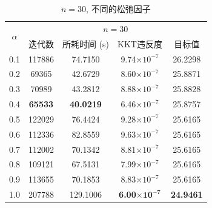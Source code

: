 \documentclass[UTF8,10.5pt,a4paper]{ctexart}
\theoremstyle{definition}
\theoremstyle{definition}
\begin{document}
\begin{table}[htbp]
	\renewcommand{\captionfont}{\small}
    \centering
    \caption{$n=30$, 不同的松弛因子}
    \label{n30alpha}
    \vskip 4mm
    \begin{tabular}{c|c|c|c|c}
        \hline
        \multirow{2}{*}{$\alpha$} & \multicolumn{4}{c}{$n=30$}\\\cline{2-5}
          & 迭代数 & 所耗时间 (s) & KKT违反度 & 目标值\\\hline
        0.1 & 117886 & 74.7150 & 9.74$\times10^{-7}$ & 26.2298 \\\hline
        0.2 & 69365 & 42.6729 & 8.60$\times10^{-7}$ & 25.8871 \\\hline
        0.3 & 70989 & 43.2812 & 8.88$\times10^{-7}$ & 25.8828 \\\hline
        0.4 & \textbf{65533} & \textbf{40.0219} & 6.46$\times10^{-7}$ & 25.8757 \\\hline
        0.5 & 122029 & 76.4424 & 9.28$\times10^{-7}$ & 25.6165 \\\hline
        0.6 & 112336 & 82.8559 & 9.63$\times10^{-7}$ & 25.6165 \\\hline
        0.7 & 112002 & 70.1342 & 8.81$\times10^{-7}$ & 25.6165 \\\hline
        0.8 & 109121 & 67.5131 & 7.99$\times10^{-7}$ & 25.6165 \\\hline
        0.9 & 113655 & 70.1853 & 8.83$\times10^{-7}$ & 25.6165 \\\hline
        1.0 & 207788 & 129.1006 & \textbf{6.00$\mathbf{\times10^{-7}}$} & \textbf{24.9461} \\\hline
    \end{tabular}
\end{table}
\end{document}
